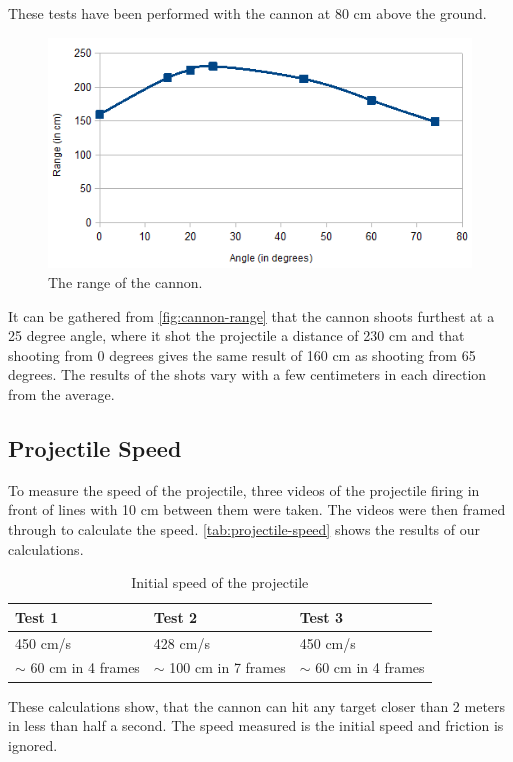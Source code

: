 These tests have been performed with the cannon at 80 cm above the ground.

\begin{figure}[hbtp]
\includegraphics[width=\textwidth]{img/cannon-range.png}
\caption{The range of the cannon.} 
\label{fig:cannon-range} 
\end{figure}

It can be gathered from \autoref{fig:cannon-range} that the cannon shoots furthest at a 25 degree angle, where it shot the projectile a distance of 230 cm and that shooting from 0 degrees gives the same result of 160 cm as shooting from 65 degrees. The results of the shots vary with a few centimeters in each direction from the average.

\subsection{Projectile Speed}
To measure the speed of the projectile, three videos of the projectile firing in front of lines with 10 cm between them were taken. The videos were then framed through to calculate the speed. \autoref{tab:projectile-speed} shows the results of our calculations.

\begin{table}[htbp]
\begin{tabular}{|p{4cm}|p{4cm}|p{4cm}|}
\hline
\textbf{Test 1} & \textbf{Test 2} & \textbf{Test 3} \\
\hline
450 cm/s & 428 cm/s & 450 cm/s\\
\hline
$\sim$ 60 cm in 4 frames & $\sim$ 100 cm in 7 frames & $\sim$ 60 cm in 4 frames \\
\hline
\end{tabular}
\caption{Initial speed of the projectile}
\label{tab:projectile-speed}
\end{table}

These calculations show, that the cannon can hit any target closer than 2 meters in less than half a second. The speed measured is the initial speed and friction is ignored.